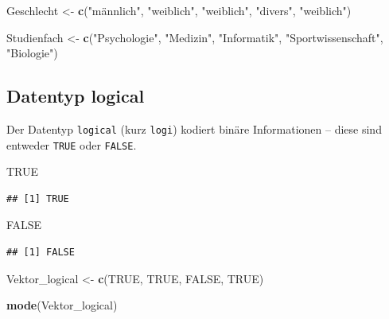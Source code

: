 \documentclass[
  ngerman,
]{book}
\newenvironment{Shaded}{\begin{snugshade}}{\end{snugshade}}
\newcommand{\ConstantTok}[1]{\textcolor[rgb]{0.56,0.35,0.01}{#1}}
\newcommand{\FunctionTok}[1]{\textcolor[rgb]{0.13,0.29,0.53}{\textbf{#1}}}
\newcommand{\NormalTok}[1]{#1}
\newcommand{\OtherTok}[1]{\textcolor[rgb]{0.56,0.35,0.01}{#1}}
\newcommand{\StringTok}[1]{\textcolor[rgb]{0.31,0.60,0.02}{#1}}
\begin{document}
\begin{Shaded}
\begin{Highlighting}[]
\NormalTok{Geschlecht }\OtherTok{\textless{}{-}} \FunctionTok{c}\NormalTok{(}\StringTok{"männlich"}\NormalTok{, }\StringTok{"weiblich"}\NormalTok{, }\StringTok{"weiblich"}\NormalTok{, }\StringTok{"divers"}\NormalTok{, }\StringTok{"weiblich"}\NormalTok{)}

\NormalTok{Studienfach }\OtherTok{\textless{}{-}} \FunctionTok{c}\NormalTok{(}\StringTok{"Psychologie"}\NormalTok{, }\StringTok{"Medizin"}\NormalTok{, }\StringTok{"Informatik"}\NormalTok{, }\StringTok{"Sportwissenschaft"}\NormalTok{, }\StringTok{"Biologie"}\NormalTok{)}
\end{Highlighting}
\end{Shaded}

\subsection{Datentyp logical}\label{datentyp-logical}

Der Datentyp \texttt{logical} (kurz \texttt{logi}) kodiert binäre Informationen -- diese sind entweder \texttt{TRUE} oder \texttt{FALSE}.

\begin{Shaded}
\begin{Highlighting}[]
\ConstantTok{TRUE} 
\end{Highlighting}
\end{Shaded}

\begin{verbatim}
## [1] TRUE
\end{verbatim}

\begin{Shaded}
\begin{Highlighting}[]
\ConstantTok{FALSE}
\end{Highlighting}
\end{Shaded}

\begin{verbatim}
## [1] FALSE
\end{verbatim}

\begin{Shaded}
\begin{Highlighting}[]
\NormalTok{Vektor\_logical }\OtherTok{\textless{}{-}} \FunctionTok{c}\NormalTok{(}\ConstantTok{TRUE}\NormalTok{, }\ConstantTok{TRUE}\NormalTok{, }\ConstantTok{FALSE}\NormalTok{, }\ConstantTok{TRUE}\NormalTok{) }

\FunctionTok{mode}\NormalTok{(Vektor\_logical)}
\end{Highlighting}
\end{Shaded}
\end{document}
